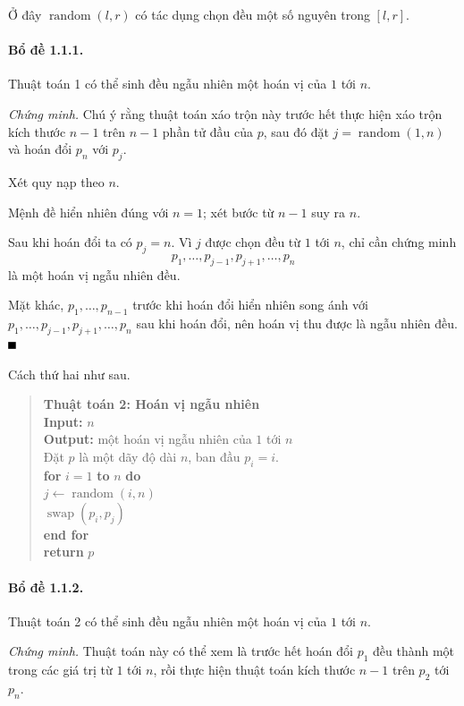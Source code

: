 \documentclass[11pt]{article}
\providecommand{\square}{\mathord{\vcenter{\hrule height .6em width .6em}}}
\begin{document}
Ở đây $\operatorname{random}(l,r)$ có tác dụng chọn đều một số nguyên trong
$[l,r]$.

\paragraph{Bổ đề 1.1.1.}
Thuật toán 1 có thể sinh đều ngẫu nhiên một hoán vị của $1$ tới $n$.

\emph{Chứng minh.}
Chú ý rằng thuật toán xáo trộn này trước hết thực hiện xáo trộn kích thước
$n-1$ trên $n-1$ phần tử đầu của $p$, sau đó đặt
$j=\operatorname{random}(1,n)$ và hoán đổi $p_n$ với $p_j$.

Xét quy nạp theo $n$.

Mệnh đề hiển nhiên đúng với $n=1$; xét bước từ $n-1$ suy ra $n$.

Sau khi hoán đổi ta có $p_j=n$. Vì $j$ được chọn đều từ $1$ tới $n$, chỉ cần
chứng minh
\[
p_1,\ldots,p_{j-1},p_{j+1},\ldots,p_n
\]
là một hoán vị ngẫu nhiên đều.

Mặt khác, $p_1,\ldots,p_{n-1}$ trước khi hoán đổi hiển nhiên song ánh với
$p_1,\ldots,p_{j-1},p_{j+1},\ldots,p_n$ sau khi hoán đổi, nên hoán vị thu được
là ngẫu nhiên đều. \hfill$\square$

Cách thứ hai như sau.

\begin{quote}
\textbf{Thuật toán 2: Hoán vị ngẫu nhiên}\\
\textbf{Input:} $n$\\
\textbf{Output:} một hoán vị ngẫu nhiên của $1$ tới $n$\\
Đặt $p$ là một dãy độ dài $n$, ban đầu $p_i=i$.\\
\textbf{for} $i=1$ \textbf{to} $n$ \textbf{do}\\
\hspace*{1.5em}$j\leftarrow \operatorname{random}(i,n)$\\
\hspace*{1.5em}$\operatorname{swap}(p_i,p_j)$\\
\textbf{end for}\\
\textbf{return} $p$
\end{quote}

\paragraph{Bổ đề 1.1.2.}
Thuật toán 2 có thể sinh đều ngẫu nhiên một hoán vị của $1$ tới $n$.

\emph{Chứng minh.}
Thuật toán này có thể xem là trước hết hoán đổi $p_1$ đều thành một trong các
giá trị từ $1$ tới $n$, rồi thực hiện thuật toán kích thước $n-1$ trên
$p_2$ tới $p_n$.
\end{document}
